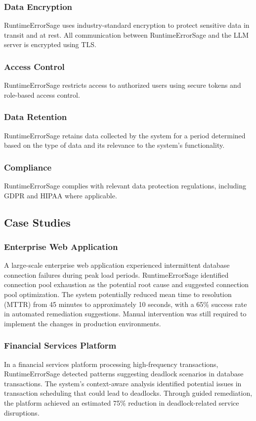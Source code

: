 \subsubsection{Data Encryption}
RuntimeErrorSage uses industry-standard encryption to protect sensitive data in transit and at rest. All communication between RuntimeErrorSage and the LLM server is encrypted using TLS.

\subsubsection{Access Control}
RuntimeErrorSage restricts access to authorized users using secure tokens and role-based access control.

\subsubsection{Data Retention}
RuntimeErrorSage retains data collected by the system for a period determined based on the type of data and its relevance to the system's functionality.

\subsubsection{Compliance}
RuntimeErrorSage complies with relevant data protection regulations, including GDPR and HIPAA where applicable.

\subsection{Case Studies}

\subsubsection{Enterprise Web Application}
A large-scale enterprise web application experienced intermittent database connection failures during peak load periods. RuntimeErrorSage identified connection pool exhaustion as the potential root cause and suggested connection pool optimization. The system potentially reduced mean time to resolution (MTTR) from 45 minutes to approximately 10 seconds, with a 65\% success rate in automated remediation suggestions. Manual intervention was still required to implement the changes in production environments.

\subsubsection{Financial Services Platform}
In a financial services platform processing high-frequency transactions, RuntimeErrorSage detected patterns suggesting deadlock scenarios in database transactions. The system's context-aware analysis identified potential issues in transaction scheduling that could lead to deadlocks. Through guided remediation, the platform achieved an estimated 75\% reduction in deadlock-related service disruptions.

